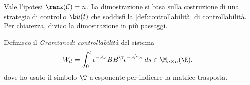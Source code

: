 Vale l'ipotesi $\rank(\mathcal C) = n$.
La dimostrazione si basa sulla costruzione di una strategia di controllo $\b u(t)$
che soddisfi la \autoref{def:controllabilità} di controllabilità.
Per chiarezza, divido la dimostrazione in più passaggi.
\begin{steps}
    \item Definisco il \emph{Gramiano\footnotemark di controllabilità} del sistema
        \begin{equation}
            W_{\mathcal C} = \int_0^t e^{-As} BB^{\T} e^{-A^\T s}\ ds \in \M_{n\times n} (\R),
            \label{eq:controllability-gramian}
        \end{equation}
    dove ho usato il simbolo $\T$ a esponente per indicare la matrice trasposta.



\end{steps}
